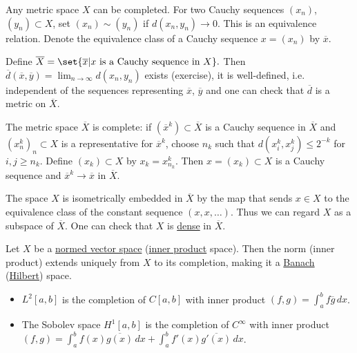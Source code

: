 \documentclass{article}
\begin{document}
\begin{remark}
    Any metric space $X$ can be completed.
    For two Cauchy sequences $(x_n)$, $(y_n) \subset X$, set $(x_n) \sim (y_n)$ if $d(x_n, y_n) \to 0$.
    This is an equivalence relation. Denote the equivalence class of a Cauchy sequence $x = (x_n)$ by $\overline{x}$.

    Define
    $\overline{X} = \set{\overline{x} | x \text{ is a Cauchy sequence in } X}.$
    Then $\overline{d}(\overline{x}, \overline{y}) = \lim_{n \to \infty} d(x_n,y_n)$ exists (exercise), it is well-defined, i.e. independent of the sequences representing $\overline{x}$, $\overline{y}$ and one can check that $\overline{d}$ is a metric on $\overline{X}$.

    The metric space $\overline{X}$ is complete: if $(\overline{x}^k) \subset \overline{X}$ is a Cauchy sequence in $\overline{X}$ and $(x^k_n)_n \subset X$ is a representative for $\overline{x}^k$, choose $n_k$ such that $d(x_i^k, x_j^k) \leq 2^{-k}$ for $i, j \geq n_k$.
    Define $(x_k) \subset X$ by $x_k = x_{n_k}^k$. Then $x = (x_k) \subset X$ is a Cauchy sequence and $\overline{x}^k \to \overline{x}$ in $\overline{X}$.

    The space $X$ is isometrically embedded in $\overline{X}$ by the map that sends $x \in X$ to the equivalence class of the constant sequence $(x, x, \dotsc)$.
    Thus we can regard $X$ as a subspace of $\overline{X}$.
    One can check that $X$ is \hyperlink{def:dense}{dense} in $\overline{X}$.
\end{remark}

\begin{ex}
    Let $X$ be a \hyperlink{def:nvs}{normed vector space} (\hyperlink{def:ip}{inner product} space).
    Then the norm (inner product) extends uniquely from $X$ to its completion, making it a \hyperlink{def:banach}{Banach} (\hyperlink{def:euclidean}{Hilbert}) space.
\end{ex}

\begin{eg}
    \leavevmode
    \begin{itemize}
        \item $L^2[a,b]$ is the completion of $C[a, b]$ with inner product $(f,g) = \int_a^b f \overline{g} \, dx$.
        \item The Sobolev space $H^1[a,b]$ is the completion of $C^\infty$ with inner product $(f, g) = \int_a^b f(x) \overline{g(x)} \, dx + \int_a^b f'(x) \overline{g'(x)} \, dx$.
    \end{itemize}
\end{eg}
\end{document}
